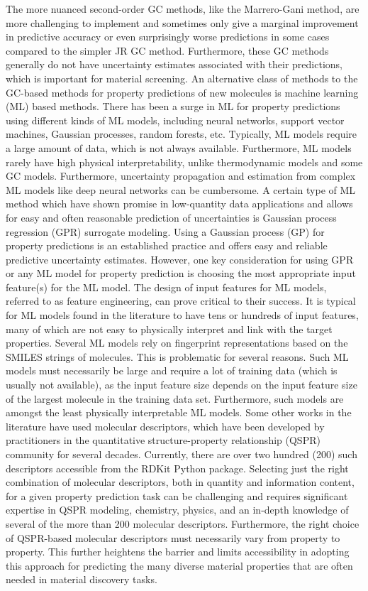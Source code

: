 \documentclass[journal=jacsat,manuscript=article]{achemso}
\begin{document}
The more nuanced second-order GC methods, like the Marrero-Gani method, are more challenging to implement and sometimes only give a marginal improvement in predictive accuracy or even surprisingly worse predictions in some cases compared to the simpler JR GC method. 
Furthermore, these GC methods generally do not have uncertainty estimates associated with their predictions, which is important for material screening.
 An alternative class of methods to the GC-based methods for property predictions of new molecules is machine learning (ML) based methods. 
 There has been a surge in ML for property predictions using different kinds of ML models, including neural networks, support vector machines, Gaussian processes, random forests, etc. Typically, ML models require a large amount of data, which is not always available. 
 Furthermore, ML models rarely have high physical interpretability, unlike thermodynamic models and some GC models. 
 Furthermore, uncertainty propagation and estimation from complex ML models like deep neural networks can be cumbersome. 
 A certain type of ML method which have shown promise in low-quantity data applications and allows for easy and often reasonable prediction of uncertainties is Gaussian process regression (GPR) surrogate modeling. 
 Using a Gaussian process (GP) for property predictions is an established practice and offers easy and reliable predictive uncertainty estimates. However, one key consideration for using GPR or any ML model for property prediction is choosing the most appropriate input feature(s) for the ML model. The design of input features for ML models, referred to as feature engineering, can prove critical to their success. It is typical for ML models found in the literature to have tens or hundreds of input features, many of which are not easy to physically interpret and link with the target properties. Several ML models rely on fingerprint representations based on the SMILES strings of molecules. This is problematic for several reasons. Such ML models must necessarily be large and require a lot of training data (which is usually not available), as the input feature size depends on the input feature size of the largest molecule in the training data set. Furthermore, such models are amongst the least physically interpretable ML models. 
 Some other works in the literature have used molecular descriptors, which have been developed by practitioners in the quantitative structure-property relationship (QSPR) community for several decades. Currently, there are over two hundred (200) such descriptors accessible from the RDKit Python package. Selecting just the right combination of molecular descriptors, both in quantity and information content, for a given property prediction task can be challenging and requires significant expertise in QSPR modeling, chemistry, physics, and an in-depth knowledge of several of the more than 200 molecular descriptors. Furthermore, the right choice of QSPR-based molecular descriptors must necessarily vary from property to property. This further heightens the barrier and limits accessibility in adopting this approach for predicting the many diverse material properties that are often needed in material discovery tasks.
\end{document}
